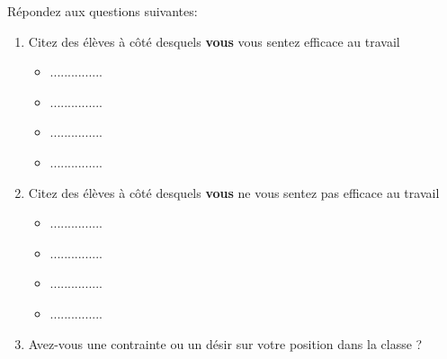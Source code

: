\begin{que}
Répondez aux questions suivantes:
    \begin{enumerate}
        \item Citez des élèves à côté desquels \textbf{vous} vous sentez efficace au travail
        \begin{multicols}{2}
            \begin{itemize}
                \item ...............
                \item ...............
                \item ...............
                \item ...............
            \end{itemize}
        \end{multicols}
        \item Citez des élèves à côté desquels \textbf{vous} ne vous sentez pas efficace au travail
        \begin{multicols}{2}
            \begin{itemize}
                \item ...............
                \item ...............
                \item ...............
                \item ...............
            \end{itemize}
        \end{multicols}
        \item Avez-vous une contrainte ou un désir sur votre position dans la classe ?
    \end{enumerate}
\end{que}



